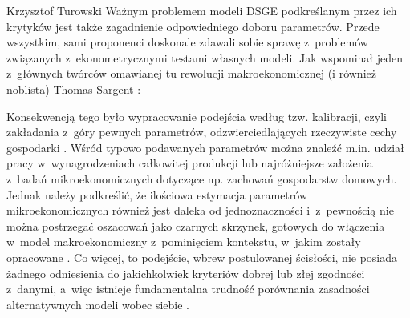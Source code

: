 \begin{artplenv}{Krzysztof Turowski}
Ważnym problemem modeli DSGE podkreślanym przez ich krytyków jest także zagadnienie odpowiedniego doboru parametrów.
Przede wszystkim, sami proponenci doskonale zdawali sobie sprawę z~problemów związanych z~ekonometrycznymi testami
własnych modeli. Jak wspominał jeden z~głównych twórców omawianej tu rewolucji makroekonomicznej (i również noblista)
Thomas Sargent
\parencite[s.~567–568]{evans_interview_2005}:


Konsekwencją tego było wypracowanie podejścia według tzw. kalibracji, czyli zakładania z~góry pewnych parametrów,
odzwierciedlających rzeczywiste cechy gospodarki
\parencite{kydland_econometrics_1991}.
Wśród typowo
podawanych parametrów można znaleźć m.in. udział pracy w~wynagrodzeniach całkowitej produkcji lub najróżniejsze
założenia z~badań mikroekonomicznych dotyczące np. zachowań gospodarstw domowych. Jednak należy podkreślić, że
ilościowa estymacja parametrów mikroekonomicznych również jest daleka od jednoznaczności i~z~pewnością nie można
postrzegać oszacowań jako czarnych skrzynek, gotowych do włączenia w~model makroekonomiczny z~pominięciem
kontekstu, w~jakim zostały opracowane
\parencite{hansen_empirical_1996}.
Co więcej, to podejście,
wbrew postulowanej
ścisłości, nie posiada żadnego odniesienia do jakichkolwiek kryteriów dobrej lub złej zgodności z~danymi, a~więc
istnieje fundamentalna trudność porównania zasadności alternatywnych modeli wobec siebie
\parencite{sims_macroeconomics_1996}.


\end{artplenv}
